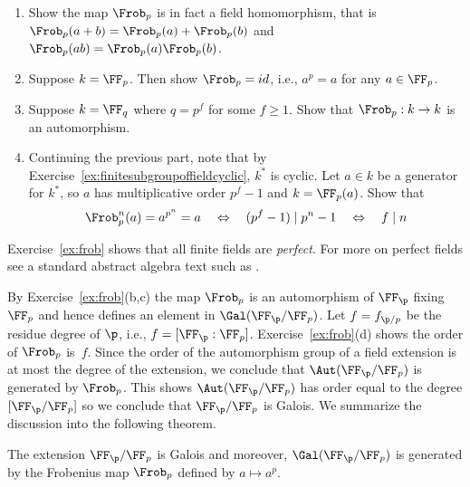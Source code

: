 \begin{exercise}\label{ex:frob}
  \hfill
  \begin{enumerate}[label=(\alph*)]
    \item Show the map $\Frob_p$ is in fact a field homomorphism,
          that is $\Frob_p(a + b) = \Frob_p(a) + \Frob_p(b)$
          and $\Frob_p(ab) = \Frob_p(a)\Frob_p(b)$.
    \item Suppose $k = \FF_p$. Then show $\Frob_p = id$, i.e.,
          $a^p = a$ for any $a\in\FF_p$.
    \item Suppose $k = \FF_{q}$ where $q=p^f$ for some $f\geq 1$.
          Show that $\Frob_p:k\to k$ is an automorphism.
    \item Continuing the previous part, note that by
          Exercise~\ref{ex:finitesubgroupoffieldcyclic}, $k^*$ is cyclic.
          Let $a\in k$ be a generator for $k^*$,
          so $a$ has multiplicative order $p^f-1$ and $k = \FF_p(a)$.
          Show that
          \[
            \Frob_p^n(a) = a^{p^n} = a
            \quad\Leftrightarrow\quad (p^f - 1) \mid p^n - 1
            \quad\Leftrightarrow\quad f \mid n
          \]
  \end{enumerate}
\end{exercise}

\begin{remark}
  Exercise~\ref{ex:frob} shows that all finite fields
  are \emph{perfect}. For more on perfect fields see
  a standard abstract algebra text such as
  \cite{dummit2004abstract}.
\end{remark}

By Exercise~\ref{ex:frob}(b,c) the map $\Frob_p$ is an
automorphism of $\FF_\p$ fixing $\FF_p$ and hence defines
an element in $\Gal(\FF_\p/\FF_p)$. Let $f = f_{\p/p}$ be the residue
degree of $\p$, i.e., $f = [\FF_\p:\FF_p]$.
Exercise~\ref{ex:frob}(d) shows the order of $\Frob_p$ is~$f$.
Since the order of the automorphism group of a field extension
is at most the degree of the extension, we conclude that
$\Aut(\FF_\p/\FF_p)$ is generated by $\Frob_p$. This shows
$\Aut(\FF_\p/\FF_p)$ has order equal to the degree $[\FF_\p/\FF_p]$
so we conclude that $\FF_\p/\FF_p$ is Galois.
We summarize the discussion into the following theorem.

\begin{theorem}\label{thm:galoisgroupfinitefield}
  The extension $\FF_{\p}/\FF_p$ is Galois and moreover,
  $\Gal(\FF_{\p}/\FF_p)$ is generated by the Frobenius map
  $\Frob_p$ defined by $a\mapsto a^p$.
\end{theorem}

